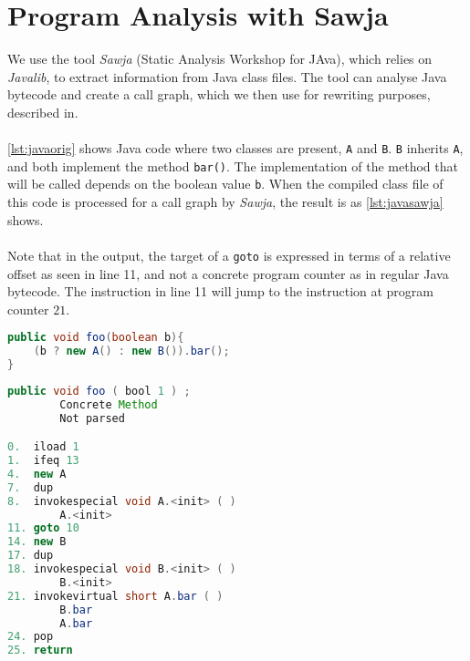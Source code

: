 \section{Program Analysis with Sawja}
We use the tool \textit{Sawja} (Static Analysis Workshop for JAva)\cite{sawja}, which relies on \textit{Javalib}, to extract information from Java class files. The tool can analyse Java bytecode and create a call graph, which we then use for rewriting purposes, described in.\\\\
\cref{lst:javaorig} shows Java code where two classes are present, \texttt{A} and \texttt{B}. \texttt{B} inherits \texttt{A}, and both implement the method \texttt{bar()}. The implementation of the method that will be called depends on the boolean value \texttt{b}. When the compiled class file of this code is processed for a call graph by \textit{Sawja}, the result is as \cref{lst:javasawja} shows.\\\\
Note that in the output, the target of a \texttt{goto} is expressed in terms of a relative offset as seen in line 11, and not a concrete program counter as in regular Java bytecode. The instruction in line 11 will jump to the instruction at program counter $21$.


\begin{minipage}{\linewidth}
\begin{lstlisting}[caption=Java sample.,language=Java,label=lst:javaorig]
public void foo(boolean b){
    (b ? new A() : new B()).bar();
}
\end{lstlisting}
\end{minipage}

\begin{minipage}{\linewidth}
\begin{lstlisting}[caption=Sawja sample. Note that the numbers on the inner left side are program counter values.,language=Java,label=lst:javasawja]
public void foo ( bool 1 ) ;
		Concrete Method
    	Not parsed

0.  iload 1
1.  ifeq 13
4.  new A
7.  dup
8.  invokespecial void A.<init> ( )
        A.<init>
11. goto 10
14. new B
17. dup
18. invokespecial void B.<init> ( )
        B.<init>
21. invokevirtual short A.bar ( )
        B.bar
        A.bar
24. pop
25. return

\end{lstlisting}
\end{minipage}